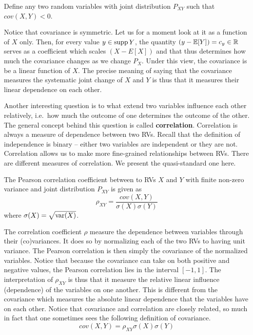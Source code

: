 \begin{Exercise}
Define any two random variables with joint distribution $ P_{XY} $ such that $ cov(X,Y) < 0 $.
\end{Exercise}

Notice that covariance is symmetric. Let us for a moment look at it as a function of $ X $ only. Then, for every value $ y \in \operatorname{supp}{Y} $, the quantity 
$ (y - \mathbb{E}[Y]) = c_{y} \in \mathbb{R} $
serves as a coefficient which scales $ (X - E[X]) $ and that thus determines how much the covariance changes as we change $ P_{X} $. 
Under this view, the covariance is be a linear function
of $ X $. The precise meaning of saying that the covariance measures the systematic joint change of $ X $ and $ Y $ is thus that it measures their linear dependence
on each other.

Another interesting question is to what extend two variables influence each other relatively, i.e.\ how much the outcome of one
determines the outcome of the other. The general concept behind this question is called \textbf{correlation}. Correlation is always a measure of dependence
between two RVs. Recall that the definition of independence is binary -- either two variables are independent or they are not.
Correlation allows us to make more fine-grained relationships between RVs. There are different measures of correlation.
We present the quasi-standard one here.
\begin{Definition}
The Pearson correlation coefficient between to RVs $ X $ and $ Y $ with finite non-zero variance and joint distribution $P_{XY}$ is given as
$$ \rho_{XY} = \frac{cov(X,Y)}{\sigma(X)\sigma(Y)} $$
where $ \sigma(X) = \sqrt{\operatorname{var}(X)} $.
\end{Definition}


The correlation coefficient $ \rho $ measure the dependence between variables through their (co)variances. It does so by normalizing each of the two RVs to having
unit variance. The Pearson correlation is then simply the covariance of the normalized variables. 
Notice that because the covariance can take on both positive and negative values, the
Pearson correlation lies in the interval $ [-1,1] $. The interpretation of $ \rho_{XY} $ is thus that it measure the relative linear influence (dependence) of the 
variables on one another. This is different from the covariance which measures the absolute linear dependence that the variables have on each other. Notice that covariance 
and correlation are closely related, so much in fact that one sometimes sees the following definition of covariance.
\begin{equation}
cov(X,Y) =  \rho_{XY} \sigma(X)\sigma(Y)
\end{equation}

